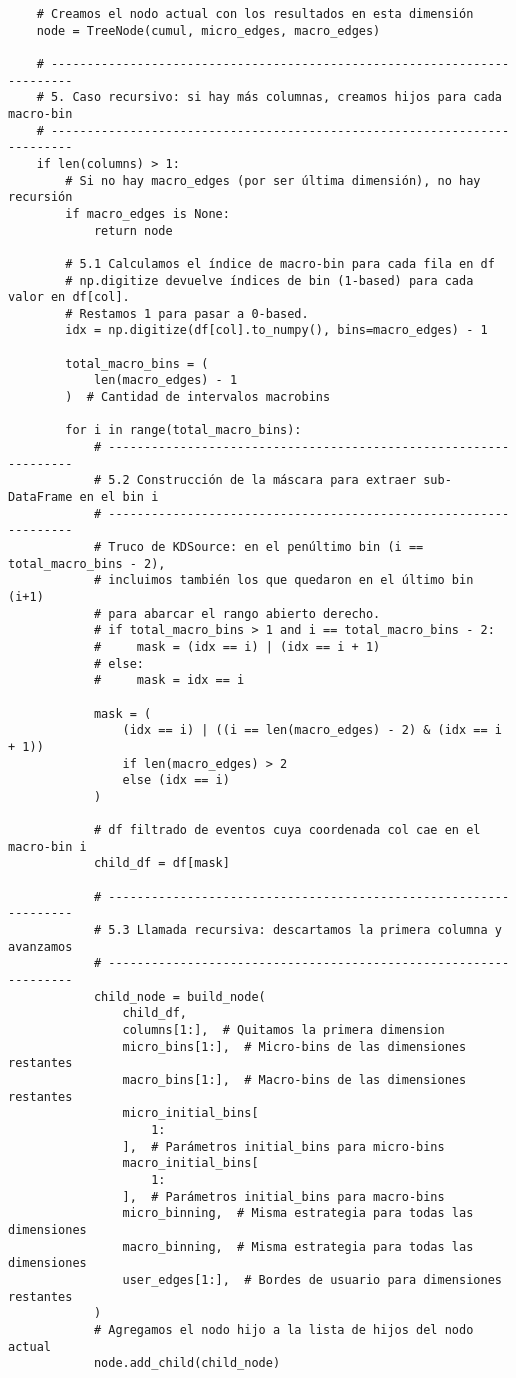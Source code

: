 \begin{verbatim}
    # Creamos el nodo actual con los resultados en esta dimensión
    node = TreeNode(cumul, micro_edges, macro_edges)

    # -------------------------------------------------------------------------
    # 5. Caso recursivo: si hay más columnas, creamos hijos para cada macro-bin
    # -------------------------------------------------------------------------
    if len(columns) > 1:
        # Si no hay macro_edges (por ser última dimensión), no hay recursión
        if macro_edges is None:
            return node

        # 5.1 Calculamos el índice de macro-bin para cada fila en df
        # np.digitize devuelve índices de bin (1-based) para cada valor en df[col].
        # Restamos 1 para pasar a 0-based.
        idx = np.digitize(df[col].to_numpy(), bins=macro_edges) - 1

        total_macro_bins = (
            len(macro_edges) - 1
        )  # Cantidad de intervalos macrobins

        for i in range(total_macro_bins):
            # -----------------------------------------------------------------
            # 5.2 Construcción de la máscara para extraer sub-DataFrame en el bin i
            # -----------------------------------------------------------------
            # Truco de KDSource: en el penúltimo bin (i == total_macro_bins - 2),
            # incluimos también los que quedaron en el último bin (i+1)
            # para abarcar el rango abierto derecho.
            # if total_macro_bins > 1 and i == total_macro_bins - 2:
            #     mask = (idx == i) | (idx == i + 1)
            # else:
            #     mask = idx == i

            mask = (
                (idx == i) | ((i == len(macro_edges) - 2) & (idx == i + 1))
                if len(macro_edges) > 2
                else (idx == i)
            )

            # df filtrado de eventos cuya coordenada col cae en el macro-bin i
            child_df = df[mask]

            # -----------------------------------------------------------------
            # 5.3 Llamada recursiva: descartamos la primera columna y avanzamos
            # -----------------------------------------------------------------
            child_node = build_node(
                child_df,
                columns[1:],  # Quitamos la primera dimension
                micro_bins[1:],  # Micro-bins de las dimensiones restantes
                macro_bins[1:],  # Macro-bins de las dimensiones restantes
                micro_initial_bins[
                    1:
                ],  # Parámetros initial_bins para micro-bins
                macro_initial_bins[
                    1:
                ],  # Parámetros initial_bins para macro-bins
                micro_binning,  # Misma estrategia para todas las dimensiones
                macro_binning,  # Misma estrategia para todas las dimensiones
                user_edges[1:],  # Bordes de usuario para dimensiones restantes
            )
            # Agregamos el nodo hijo a la lista de hijos del nodo actual
            node.add_child(child_node)


\end{verbatim}
